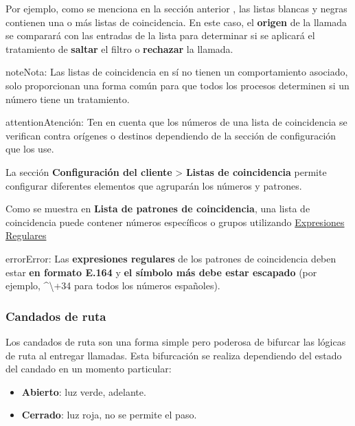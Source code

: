 \documentclass[letterpaper,10pt,spanish]{sphinxmanual}
\begin{document}
Por ejemplo, como se menciona en la sección anterior {\hyperref[administration_portal/client/vpbx/routing_tools/external_call_filters:external\string-filters]{}}, las listas blancas y negras contienen una o más listas de coincidencia. En este caso, el \textbf{origen} de la llamada se comparará con las entradas de la lista para determinar si se aplicará el tratamiento de \textbf{saltar} el filtro o \textbf{rechazar} la llamada.

\begin{notice}{note}{Nota:}
Las listas de coincidencia en sí no tienen un comportamiento asociado, solo proporcionan una forma común para que todos los procesos determinen si un número tiene un tratamiento.
\end{notice}

\begin{notice}{attention}{Atención:}
Ten en cuenta que los números de una lista de coincidencia se verifican contra orígenes o destinos dependiendo de la sección de configuración que los use.
\end{notice}

La sección \textbf{Configuración del cliente} \textgreater{} \textbf{Listas de coincidencia} permite configurar diferentes elementos que agruparán los números y patrones.

Como se muestra en \textbf{Lista de patrones de coincidencia}, una lista de coincidencia puede contener números específicos o grupos utilizando \href{http://php.net/manual/en/reference.pcre.pattern.syntax.php}{Expresiones Regulares}

\begin{notice}{error}{Error:}
Las \textbf{expresiones regulares} de los patrones de coincidencia deben estar \textbf{en formato E.164} y \textbf{el símbolo más debe estar escapado} (por ejemplo, \textasciicircum{}\textbackslash{}+34 para todos los números españoles).
\end{notice}
\label{administration_portal/client/vpbx/routing_tools/route_locks:route-locks}

\subsubsection{Candados de ruta}
\label{administration_portal/client/vpbx/routing_tools/route_locks:id2}\label{administration_portal/client/vpbx/routing_tools/route_locks:route-locks}\label{administration_portal/client/vpbx/routing_tools/route_locks::doc}\label{administration_portal/client/vpbx/routing_tools/route_locks:id1}
Los candados de ruta son una forma simple pero poderosa de bifurcar las lógicas de ruta al entregar llamadas. Esta bifurcación se realiza dependiendo del estado del candado en un momento particular:
\begin{itemize}
\item {} 
\textbf{Abierto}: luz verde, adelante.

\item {} 
\textbf{Cerrado}: luz roja, no se permite el paso.

\end{itemize}
\end{document}
